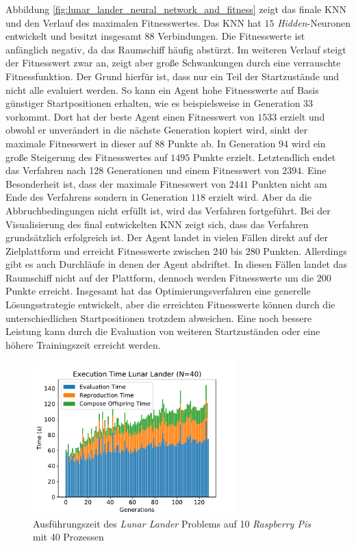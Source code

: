 Abbildung \ref{fig:lunar_lander_neural_network_and_fitness} zeigt das finale \ac{KNN} und den Verlauf des maximalen Fitnesswertes. Das \ac{KNN} hat $15$ \emph{Hidden}-Neuronen entwickelt und besitzt insgesamt $88$ Verbindungen. Die Fitnesswerte ist anfänglich negativ, da das Raumschiff häufig abstürzt. Im weiteren Verlauf steigt der Fitnesswert zwar an, zeigt aber große Schwankungen durch eine verrauschte Fitnessfunktion. Der Grund hierfür ist, dass nur ein Teil der Startzustände und nicht alle evaluiert werden. So kann ein Agent hohe Fitnesswerte auf Basis günstiger Startpositionen erhalten, wie es beispielsweise in Generation $33$ vorkommt. Dort hat der beste Agent einen Fitnesswert von $1533$ erzielt und obwohl er unverändert in die nächste Generation kopiert wird, sinkt der maximale Fitnesswert in dieser auf $88$ Punkte ab. In Generation $94$ wird ein große Steigerung des Fitnesswertes auf $1495$ Punkte erzielt. Letztendlich endet das Verfahren nach 128 Generationen und einem Fitnesswert von $2394$. Eine Besonderheit ist, dass der maximale Fitnesswert von $2441$ Punkten nicht am Ende des Verfahrens sondern in Generation $118$ erzielt wird. Aber da die Abbruchbedingungen nicht erfüllt ist, wird das Verfahren fortgeführt. Bei der Visualisierung des final entwickelten \ac{KNN} zeigt sich, dass das Verfahren grundsätzlich erfolgreich ist. Der Agent landet in vielen Fällen direkt auf der Zielplattform und erreicht Fitnesswerte zwischen $240$ bis $280$ Punkten. Allerdings gibt es auch Durchläufe in denen der Agent abdriftet. In diesen Fällen landet das Raumschiff nicht auf der Plattform, dennoch werden Fitnesswerte um die $200$ Punkte erreicht. Insgesamt hat das Optimierungsverfahren eine generelle Lösungsstrategie entwickelt, aber die erreichten Fitnesswerte können durch die unterschiedlichen Startpositionen trotzdem abweichen. Eine noch bessere Leistung kann durch die Evaluation von weiteren Startzuständen oder eine höhere Trainingszeit erreicht werden.
\begin{figure}[!h]
	\centering
	\includegraphics[width=0.7\textwidth]{./img/lunar_lander/lunar_lander_time_40.pdf} 
	\caption{Ausführungszeit des \emph{Lunar Lander} Problems auf 10 \emph{Raspberry Pis} mit 40 Prozessen}
	\label{fig:lunar_lander_time_40core_10pi}
\end{figure}
